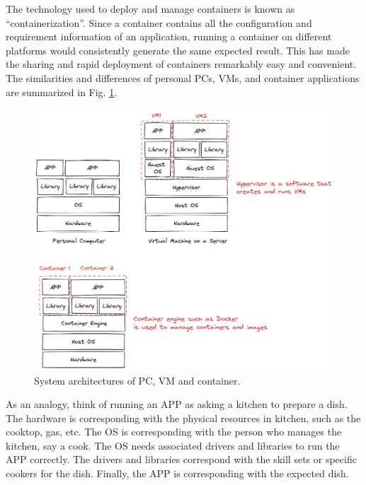 The technology used to deploy and manage containers is known as ``containerization''. Since a container contains all the configuration and requirement information of an application, running a container on different platforms would consistently generate the same expected result. This has made the sharing and rapid deployment of containers remarkably easy and convenient. The similarities and differences of personal PCs, VMs, and container applications are summarized in Fig. \ref{ch:vac:fig:pcvmcontainersructure}.

\begin{figure}
	\centering
	\includegraphics[width=350pt]{chapters/ch-virtualization-and-containerization/figures/pcvmcontainerstructure.png}
	\caption{System architectures of PC, VM and container.} \label{ch:vac:fig:pcvmcontainersructure}
\end{figure}

As an analogy, think of running an APP as asking a kitchen to prepare a dish. The hardware is corresponding with the physical resources in kitchen, such as the cooktop, gas, etc. The OS is corresponding with the person who manages the kitchen, say a cook. The OS needs associated drivers and libraries to run the APP correctly. The drivers and libraries correspond with the skill sets or specific cookers for the dish. Finally, the APP is corresponding with the expected dish.

